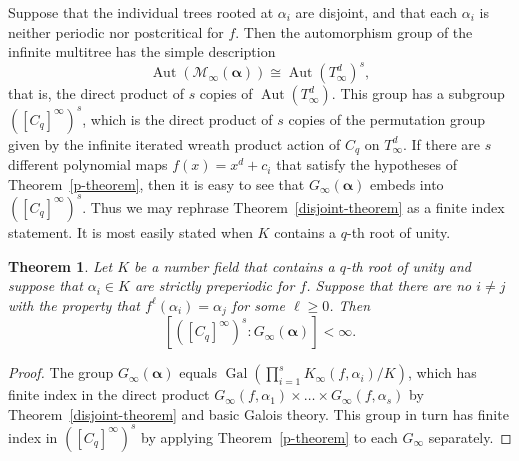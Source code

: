 \documentclass[11pt]{amsart}
\newtheorem{thm}{Theorem}
\theoremstyle{definition}
\theoremstyle{definition}
\numberwithin{thm}{section}
\numberwithin{equation}{thm}
\newcommand{\cM}{\mathcal M}
\newcommand{\ba}{{\boldsymbol \alpha}}
\DeclareMathOperator{\Gal}{Gal}
\DeclareMathOperator{\Aut}{Aut}
\begin{document}

Suppose that the individual trees rooted at $\alpha_i$ are disjoint, and that each $\alpha_i$ is neither periodic 
nor postcritical for $f$. Then the automorphism group of the infinite multitree has the simple description
\[\Aut(\cM_\infty(\ba))\cong \Aut(T_\infty^d)^s,\]
that is, the direct product of $s$ copies of $\Aut(T_\infty^d)$. 
This group has a subgroup $\left([C_q]^\infty\right)^s$, which is the direct product of $s$ copies of the 
permutation group given 
by the infinite iterated wreath product action of $C_q$ on $T_\infty^d$. If there are 
$s$ different polynomial maps $f(x)=x^d+c_i$ that satisfy the hypotheses of Theorem~\ref{p-theorem}, 
then it is easy to see that 
$G_\infty(\ba)$ embeds into $\left([C_q]^\infty\right)^s$. Thus we may rephrase Theorem~\ref{disjoint-theorem} 
as a finite index statement.  It is most easily stated when $K$
contains a $q$-th root of unity.  

\begin{thm}\label{multitree theorem}
  Let $K$ be a number field that contains a $q$-th root of unity and
  suppose that $\alpha_i\in K$ are strictly preperiodic for $f$.
  Suppose that there are no $i \ne j$ with the property that
  $f^{\ell}(\alpha_i) = \alpha_j$ for some $\ell \geq 0$. Then
  \[[\left([C_q]^\infty\right)^s:G_\infty(\ba)]<\infty.\]
\end{thm}

\begin{proof}
The group $G_\infty(\ba)$ equals $\Gal(\prod_{i=1}^s K_\infty(f,\alpha_i)/K)$, which has 
finite index in the direct product $G_\infty(f,\alpha_1)\times\dots\times G_\infty(f,\alpha_s)$ by 
Theorem~\ref{disjoint-theorem} and basic Galois theory. This group in turn has finite index 
in $\left([C_q]^\infty\right)^s$ by applying Theorem~\ref{p-theorem} to each $G_\infty$ separately. 
\end{proof}
\end{document}
